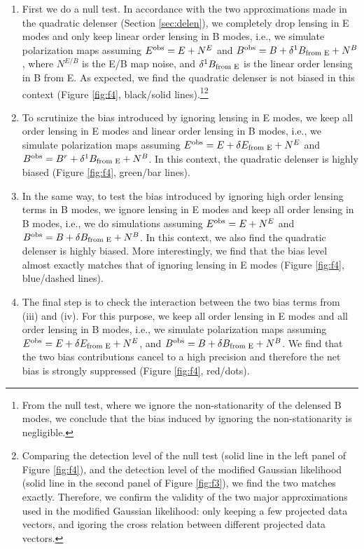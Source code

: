 \documentclass[iop,apj, numberedappendix]{emulateapj}
\begin{document}
\begin{enumerate}[label=(\roman*)]
    \item First we do a null test.
In accordance with the two approximations made in the quadratic delenser (Section \ref{sec:delen}),
we completely drop lensing in E modes and only keep linear order lensing in B modes, i.e.,
we simulate polarization maps assuming $E^{\rm obs} = E + N^E$
and $B^{\rm obs} = B + \delta^1B_{\text{\rm from E}} + N^B$, where
$N^{E/B}$ is the E/B map noise, and  $\delta^1B_{\text{\rm from E}}$ is the linear order lensing in B from E.
As expected, we find the quadratic delenser is not biased in this context
(Figure \ref{fig:f4}, black/solid lines).\footnote{From the null test,
where we ignore the non-stationarity of the delensed B modes,
we conclude that the bias induced by ignoring  the non-stationarity
is negligible.}\footnote{Comparing the detection level of the null test (solid line in the left panel of Figure \ref{fig:f4}),
and the detection level of the modified Gaussian likelihood (solid line in the second panel of Figure \ref{fig:f3}),
we find the two matches exactly. Therefore, we confirm the validity of
the two major approximations used in the modified Gaussian likelihood:
only keeping a few projected data vectors,
and igoring the cross relation between different projected data vectors.}

    \item To scrutinize the bias introduced by ignoring lensing in E modes,
we keep all order lensing in E modes and linear order lensing in B modes,
i.e., we simulate polarization maps assuming
$E^{\rm obs} = E +  \delta E_{\text{\rm from E}} + N^E$
and $B^{\rm obs} = B^r + \delta^1B_{\text{\rm from E}} + N^B$.
In this context, the quadratic delenser is highly biased (Figure \ref{fig:f4}, green/bar lines).

    \item In the same way, to test the bias introduced by ignoring high order lensing terms in B modes,
we ignore lensing in E modes and keep all order lensing in B modes, i.e.,
we do simulations assuming $E^{\rm obs} = E  + N^E$
and $B^{\rm obs} = B + \delta B_{\text{\rm from E}} + N^B$.
In this context, we also find the quadratic delenser is highly biased.
More interestingly, we find that the bias level almost exactly matches that of ignoring lensing in E modes
(Figure \ref{fig:f4}, blue/dashed lines).

    \item The final step is to check the interaction between the two bias terms from (iii) and (iv).
For this purpose, we keep all order lensing in E modes and all order lensing in B modes,
i.e., we simulate polarization maps assuming $E^{\rm obs} = E + \delta E_{\text{\rm from E}} + N^E$,
and $B^{\rm obs} = B +  \delta B_{\text{\rm from E}} + N^B$.
We find that the two bias contributions cancel to a high precision
and therefore the net bias is strongly suppressed (Figure \ref{fig:f4}, red/dots).


\end{enumerate}
\end{document}
